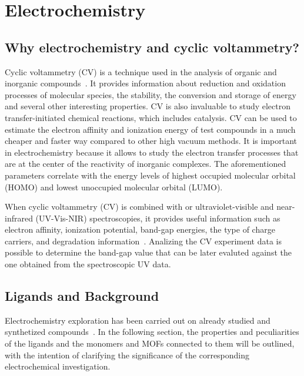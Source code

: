\documentclass[../Master.tex]{subfiles}
\begin{document}
\newpage
\section{Electrochemistry}\label{sec:electrochemistry}

\subsection{Why electrochemistry and cyclic voltammetry?}\label{sec:elect-intro}

Cyclic voltammetry (CV) is a technique used in the analysis of organic and inorganic compounds\ \cite{elgrishi_practical_2018}. It provides information about reduction and oxidation processes of molecular species, the stability, the conversion and storage of energy and several other interesting properties. CV is also invaluable to study electron transfer-initiated chemical reactions, which includes catalysis. CV can be used to estimate the electron affinity and ionization energy of test compounds in a much cheaper and faster way compared to other high vacuum methods. It is important in electrochemistry because it allows to study the electron transfer processes that are at the center of the reactivity of inorganic complexes.
The aforementioned parameters correlate with the energy levels of highest occupied molecular orbital (HOMO) and lowest unoccupied molecular orbital (LUMO).

When cyclic voltammetry (CV) is combined with or ultraviolet-visible and near-infrared (UV-Vis-NIR) spectroscopies, it provides useful information such as electron affinity, ionization potential, band-gap energies, the type of charge carriers, and degradation information\ \cite{pluczyk_using_2018}. Analizing the CV experiment data is possible to determine the band-gap value that can be later evaluted against the one obtained from the spectroscopic UV data.

\subsection{Ligands and Background}

Electrochemistry exploration has been carried out on already studied and synthetized compounds\ \cite{carlucci_heterometallic_2010}. In the following section, the properties and peculiarities of the ligands and the monomers and MOFs connected to them will be outlined, with the intention of clarifying the significance of the corresponding electrochemical investigation.
\end{document}
